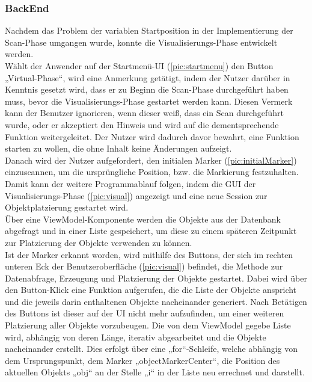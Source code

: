 \subsubsection{BackEnd}
Nachdem das Problem der variablen Startposition in der Implementierung der Scan-Phase umgangen wurde, konnte die Visualisierungs-Phase entwickelt werden. 
\\ 
\linebreak
Wählt der Anwender auf der Startmenü-\acs{UI} (\ref{pic:startmenu}) den Button „Virtual-Phase“, wird eine Anmerkung getätigt, indem der Nutzer darüber in 
Kenntnis gesetzt wird, dass er zu Beginn die Scan-Phase durchgeführt haben muss, bevor die Visualisierungs-Phase gestartet werden kann. Diesen Vermerk kann der 
Benutzer ignorieren, wenn dieser weiß, dass ein Scan durchgeführt wurde, oder er akzeptiert den Hinweis und wird auf die dementsprechende Funktion weitergeleitet. 
Der Nutzer wird dadurch davor bewahrt, eine Funktion starten zu wollen, die ohne Inhalt keine Änderungen aufzeigt.
\\ 
Danach wird der Nutzer aufgefordert, den initialen Marker (\ref{pic:initialMarker}) einzuscannen, um die ursprüngliche Position, bzw. die Markierung festzuhalten. 
Damit kann der weitere Programmablauf folgen, indem die \acs{GUI} der Visualisierungs-Phase (\ref{pic:visual}) angezeigt und eine neue Session zur 
Objektplatzierung gestartet wird. 
\\
Über eine ViewModel-Komponente werden die Objekte aus der Datenbank abgefragt und in einer Liste gespeichert, um diese zu einem späteren Zeitpunkt zur Platzierung der 
Objekte verwenden zu können. 
\\ 
Ist der Marker erkannt worden, wird mithilfe des Buttons, der sich im rechten unteren Eck der Benutzeroberfläche (\ref{pic:visual}) befindet, die Methode zur 
Datenabfrage, Erzeugung und Platzierung der Objekte gestartet. Dabei wird über den Button-Klick eine Funktion aufgerufen, die die Liste der Objekte anspricht und 
die jeweils darin enthaltenen Objekte nacheinander generiert. Nach Betätigen des Buttons ist dieser auf der \acs{UI} nicht mehr aufzufinden, um einer weiteren 
Platzierung aller Objekte vorzubeugen. Die von dem ViewModel gegebe Liste wird, abhängig von deren Länge, iterativ abgearbeitet und die Objekte 
nacheinander erstellt. Dies erfolgt über eine „for“-Schleife, welche abhängig von dem Ursprungspunkt, dem Marker „objectMarkerCenter“, die Position des 
aktuellen Objekts „obj“ an der Stelle „i“ in der Liste neu errechnet und darstellt.
\\ 
